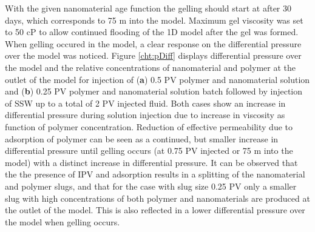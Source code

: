 \documentclass[energies,article,submit,moreauthors,pdftex]{Definitions/mdpi}
\begin{document}
With the given nanomaterial age function the gelling should start at after 30 days, which corresponds to 75 m into the model. Maximum gel viscosity was set to 50 cP to allow continued flooding of the 1D model after the gel was formed. When gelling occured in the model, a clear response on the differential pressure over the model was noticed. Figure \ref{cht:pDiff} displays differential pressure over the model and the relative concentrations of nanomaterial and polymer at the outlet of the model for injection of (\textbf{a}) 0.5 PV polymer and nanomaterial solution and (\textbf{b}) 0.25 PV polymer and nanomaterial solution batch followed by injection of SSW up to a total of 2 PV injected fluid. Both cases show an increase in differential pressure during solution injection due to increase in viscosity as function of polymer concentration. Reduction of effective permeability due to adsorption of polymer can be seen as a continued, but smaller increase in differential pressure until gelling occurs (at 0.75 PV injected or 75 m into the model) with a distinct increase in differential pressure. It can be observed that the the presence of IPV and adsorption results in a splitting of the nanomaterial and polymer slugs, and that for the case with slug size 0.25 PV only a smaller slug with high concentrations of both polymer and nanomaterials are produced at the outlet of the model. This is also reflected in a lower differential pressure over the model when gelling occurs. 
\end{document}
